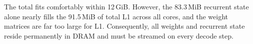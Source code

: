 The total fits comfortably within 12\,GiB. However, the 83.3\,MiB recurrent state alone nearly fills the 91.5\,MiB of total L1 across all cores, and the weight matrices are far too large for L1. Consequently, all weights and recurrent state reside permanently in DRAM and must be streamed on every decode step.

